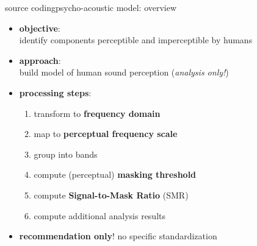 	\begin{frame}{source coding}{psycho-acoustic model: overview}
        \begin{itemize}
            \item   \textbf{objective}:\\ identify components perceptible and imperceptible by humans
            \pause
            \smallskip
            \item   \textbf{approach}:\\ build model of human sound perception (\textit{analysis only!})
            \pause
            \smallskip
            \item   \textbf{processing steps}:
                \begin{enumerate}
                    \item	transform to \textbf{frequency domain}
                    \pause
                    \item	map to \textbf{perceptual frequency scale}
                    \pause
                    \item   group into bands
                    \pause
                    \item	compute (perceptual) \textbf{masking threshold}
                    \pause
                    \item	compute \textbf{Signal-to-Mask Ratio} (SMR)
                    \pause
                    \item   compute additional analysis results
                \end{enumerate}
            \pause
            \smallskip
            \item   \textbf{recommendation only}! no specific standardization
        \end{itemize}
	\end{frame}
	
